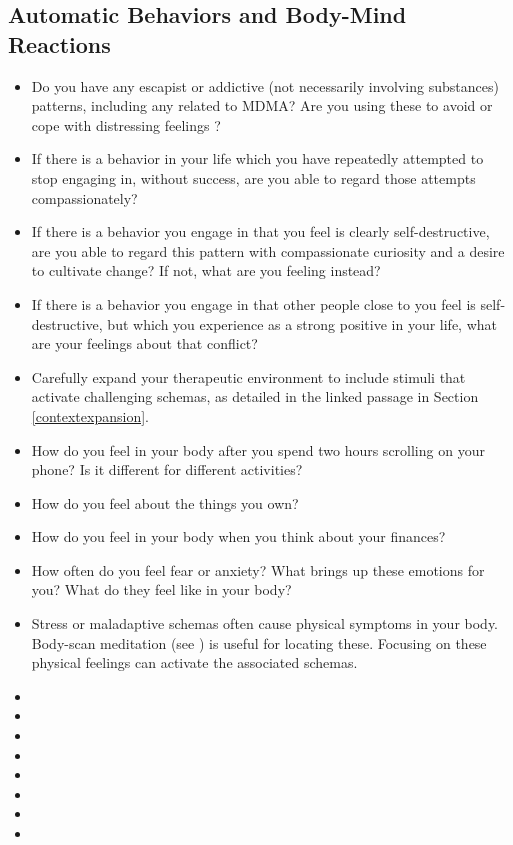 \documentclass[12pt,letterpaper]{book}
\begin{document}
\subsection*{Automatic Behaviors and Body-Mind Reactions}
\begin{itemize}
    \item Do you have any escapist or addictive (not necessarily involving substances) patterns, including any related to MDMA? Are you using these to avoid or cope with distressing feelings \cite{forsterTraumaAddiction,alaviBehavioralAddiction}?
    \item If there is a behavior in your life which you have repeatedly attempted to stop engaging in, without success, are you able to regard those attempts compassionately?
    \item If there is a behavior you engage in that you feel is clearly self-destructive, are you able to regard this pattern with compassionate curiosity and a desire to cultivate change? If not, what are you feeling instead?
    \item If there is a behavior you engage in that other people close to you feel is self-destructive, but which you experience as a strong positive in your life, what are your feelings about that conflict?
    \item Carefully expand your therapeutic environment to include stimuli that activate challenging schemas, as detailed in the linked passage in Section \ref{contextexpansion}.
    \item How do you feel in your body after you spend two hours scrolling on your phone? Is it different for different activities?
    \item How do you feel about the things you own?
    \item How do you feel in your body when you think about your finances?
    \item How often do you feel fear or anxiety? What brings up these emotions for you? What do they feel like in your body?
    \item Stress or maladaptive schemas often cause physical symptoms in your body. Body-scan meditation (see \textcite{bodyscan}) is useful for locating these. Focusing on these physical feelings can activate the associated schemas.
\end{itemize}

\begin{itemize}
    \item {}
    \item {}
    \item {}
    \item {}
    \item {}
    \item {}
    \item {}
    \item {}
\end{itemize}
\printglossaries
{}
\label{sec:glossary}
\appendix
\end{document}
